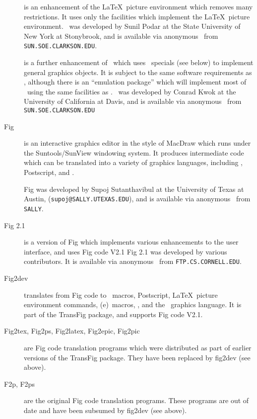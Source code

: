 \begin{description}

\item[\EPIC]
	is an enhancement of the \LaTeX\ picture environment which
	removes many restrictions.
It uses only the facilities which implement the \LaTeX\ picture environment.
\EPIC\ was developed by Sunil Podar at the State University of New York
	at Stonybrook, and is available via anonymous
	\FTP\ from {\tt SUN.SOE.CLARKSON.EDU}.

\item[\EEPIC]
	is a further enhancement of \EPIC\ which uses \tpic\ specials
	(see below) to implement general graphics objects.
It is subject to the same software requirements as \tpic,
	although there is an ``emulation package'' which will
	implement most of \EEPIC\ using the same facilities as \EPIC.
\EEPIC\ was developed by Conrad Kwok at the University of California at Davis,
	and is available via anonymous \FTP\  from {\tt SUN.SOE.CLARKSON.EDU}

\item[Fig]
	is an interactive graphics editor in the style of MacDraw
	which runs under the Suntools/SunView windowing system.
It produces intermediate code which can be translated into
	a variety of graphics languages, including \PIC, Postscript,
	and \PicTeX.

Fig was developed by Supoj Sutanthavibul at the University of Texas at Austin,
	({\tt supoj@SALLY.UTEXAS.EDU}), and is available via anonymous
	\FTP\  from {\tt SALLY}.

\item[Fig 2.1]
	is a version of Fig which implements various
	enhancements to the user interface, and uses Fig code V2.1
Fig 2.1 was developed by various contributors.
It is available via anonymous \FTP\ from {\tt FTP.CS.CORNELL.EDU}.

\item[Fig2dev]
	translates  from Fig code to \PicTeX\ macros, Postscript,
	\LaTeX\ picture environment commands, {\sc (e)}\EPIC\ macros, \textyl,
	and the \PIC\ graphics language.
It is part of the TransFig package, and supports Fig code V2.1.

\item[Fig2tex, Fig2ps, Fig2latex, Fig2epic, Fig2pic]
	are Fig code translation programs which were distributed as
	part of earlier versions of the TransFig package.
They have been replaced by fig2dev (see above).

\item[F2p, F2ps]
	are the original Fig code translation programs.
These programs are out of date and have been subsumed by fig2dev (see above).


\end{description}
